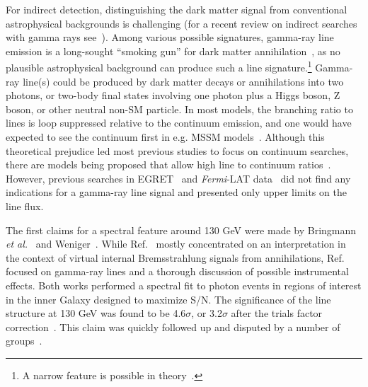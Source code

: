 \documentclass[aps,prd,superscriptaddress,showpacs]{revtex4}
\newcommand{\Fermi}{{\slshape Fermi}}
\begin{document}
For indirect detection, distinguishing the dark matter
signal from conventional astrophysical backgrounds is
challenging
(for a recent review on indirect searches with gamma rays
see~\cite{Bringmann:2012ez}).
Among various possible signatures, gamma-ray
line emission is a long-sought ``smoking
gun'' for dark matter annihilation~\cite{Bergstrom:1988fp}, as no plausible
astrophysical background can produce such a line
signature.\footnote{A narrow feature is
possible in theory~\citep[see][]{2012arXiv1207.0458A}.}  Gamma-ray line(s)
could be produced by dark matter decays or annihilations
into two photons, or two-body final states involving one
photon plus a Higgs boson, Z boson, or other neutral non-SM
particle.  In most models, the branching ratio
to lines is loop suppressed relative to the continuum
emission, and one would have expected to see the continuum
first in e.g. MSSM models~\citep[e.g.][]{Bergstrom:1997}.
Although this theoretical prejudice led most previous
studies to focus on continuum searches, there are models
being proposed that allow high line to continuum
ratios~\citep[e.g.][]{Bergstrom:1998, Bergstrom:2000,
Bertone:2009, Jackson:2010, Cline:2012, Weiner:2012}.
However, previous searches in EGRET~\cite{Pullen:2006sy} and \Fermi-LAT
data~\cite{Abdo:2010nc, Vertongen:2011mu, Ackermann:2012qk}
did not find any
indications for a gamma-ray line signal and presented only upper limits on the
line flux.

The first claims for a spectral feature around 130 GeV were made by Bringmann
\textit{et al.}~\citep{Bringmann:2012} and Weniger~\citep{Weniger:2012}. While
Ref.~\citep{Bringmann:2012} mostly concentrated on an interpretation in the context of
virtual internal Bremsstrahlung signals from annihilations,
Ref.~\citep{Weniger:2012} focused on gamma-ray lines and a thorough discussion
of possible instrumental effects.  Both works performed a spectral fit to
photon events in regions of interest in
the inner Galaxy designed to maximize S/N. The significance of the line structure
at 130 GeV was found to be 4.6$\sigma$, or 3.2$\sigma$ after the trials factor
correction~\citep{Weniger:2012}.
This claim was quickly followed up and disputed by a number of
groups~\cite{tempel:2012ey, Boyarsky:2012ca}.
\end{document}
